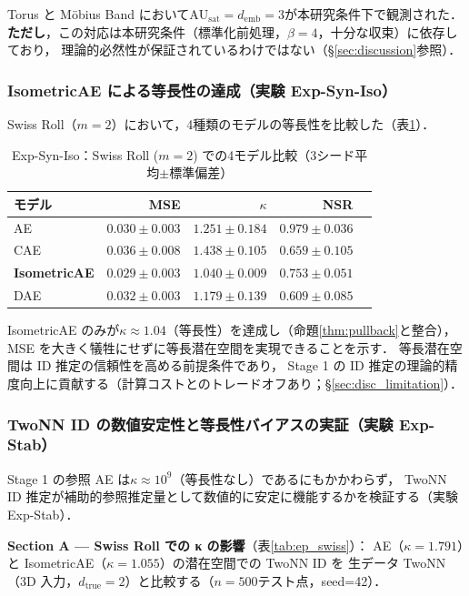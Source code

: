 \documentclass[11pt,a4paper]{jsarticle}
\newcommand{\kap}{\kappa}
\newcommand{\AUsat}{\mathrm{AU}_{\mathrm{sat}}}
\newcommand{\demb}{d_{\mathrm{emb}}}
\begin{document}
Torus と Möbius Band において$\AUsat = \demb = 3$が本研究条件下で観測された．
\textbf{ただし}，この対応は本研究条件（標準化前処理，$\beta = 4$，十分な収束）に依存しており，
理論的必然性が保証されているわけではない（§\ref{sec:discussion}参照）．

\subsubsection{IsometricAE による等長性の達成（実験 Exp-Syn-Iso）}

Swiss Roll（$m = 2$）において，4種類のモデルの等長性を比較した（表\ref{tab:ec}）．

\begin{table}[H]
\centering
\caption{Exp-Syn-Iso：Swiss Roll ($m=2$) での4モデル比較（3シード平均$\pm$標準偏差）}
\label{tab:ec}
\small
\begin{tabular}{lrrrr}
\toprule
モデル & MSE & $\kap$ & NSR \\
\midrule
AE & $0.030\pm0.003$ & $1.251\pm0.184$ & $0.979\pm0.036$ \\
CAE & $0.036\pm0.008$ & $1.438\pm0.105$ & $0.659\pm0.105$ \\
\textbf{IsometricAE} & $\boldsymbol{0.029\pm0.003}$ & $\boldsymbol{1.040\pm0.009}$ & $0.753\pm0.051$ \\
DAE & $0.032\pm0.003$ & $1.179\pm0.139$ & $0.609\pm0.085$ \\
\bottomrule
\end{tabular}
\end{table}

IsometricAE のみが$\kap \approx 1.04$（等長性）を達成し（命題\ref{thm:pullback}と整合），
MSE を大きく犠牲にせずに等長潜在空間を実現できることを示す．
等長潜在空間は ID 推定の信頼性を高める前提条件であり，
Stage 1 の ID 推定の理論的精度向上に貢献する（計算コストとのトレードオフあり；§\ref{sec:disc_limitation}）．

\subsubsection{TwoNN ID の数値安定性と等長性バイアスの実証（実験 Exp-Stab）}\label{sec:exp_ep}

Stage 1 の参照 AE は$\kap \approx 10^9$（等長性なし）であるにもかかわらず，
TwoNN ID 推定が補助的参照推定量として数値的に安定に機能するかを検証する（実験 Exp-Stab）．

\textbf{Section A — Swiss Roll での κ の影響}（表\ref{tab:ep_swiss}）：
AE（$\kap = 1.791$）と IsometricAE（$\kap = 1.055$）の潜在空間での TwoNN ID を
生データ TwoNN（3D 入力，$d_\mathrm{true}=2$）と比較する（$n=500$テスト点，seed=42）．
\end{document}
